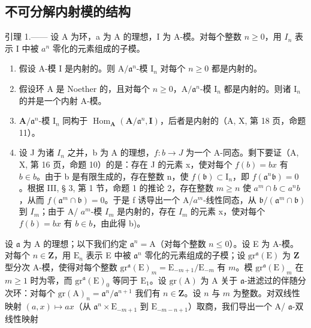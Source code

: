 \subsection{不可分解内射模的结构}

引理 1.—— 设 A 为环，a 为 A 的理想，I 为 A-模。对每个整数 \(n \geqslant 0\)，用 \(I_{n}\) 表示 I 中被 \(a^{n}\) 零化的元素组成的子模。

\begin{enumerate}
\def\labelenumi{\alph{enumi})}
\item
  假设 A-模 I 是内射的。则 \(\mathrm{A} / \mathfrak{a}^n\)-模 \(\mathrm{I}_n\) 对每个 \(n \geqslant 0\) 都是内射的。
\item
  假设环 A 是 Noether 的，且对每个 \(n \geqslant 0\)，\(\mathrm{A} / \mathfrak{a}^n\)-模 \(\mathrm{I}_n\) 都是内射的。则诸 \(\mathrm{I}_n\) 的并是一个内射 A-模。
\item
  \(\mathbf{A} / \mathfrak{a}^n\)-模 \(\mathrm{I}_n\) 同构于 \(\operatorname{Hom}_{\mathbf{A}}(\mathbf{A} / \mathfrak{a}^n, \mathbf{I})\)，后者是内射的（A, X, 第 18 页，命题 11）。
\item
  设 J 为诸 \(I_{n}\) 之并，b 为 A 的理想，\(f : b \to J\) 为一个 A-同态。剩下要证（A, X, 第 16 页，命题 10）的是：存在 J 的元素 x，使对每个 \(f(b) = bx\) 有 \(b \in b\)。由于 b 是有限生成的，存在整数 n，使 \(f(\mathfrak{b}) \subset \mathrm{I}_{n}\)，即 \(f(\mathfrak{a}^{n}\mathfrak{b}) = 0\)。根据 III, § 3, 第 1 节，命题 1 的推论 2，存在整数 \(m \geqslant n\) 使 \(a^{m} \cap b \subset a^{n}b\)，从而 \(f(\mathfrak{a}^{m} \cap \mathfrak{b}) = 0\)。于是 f 诱导出一个 A/\(a^{m}\)-线性同态，从 \(\mathfrak{b}/(\mathfrak{a}^{m} \cap \mathfrak{b})\) 到 \(I_{m}\)；由于 A/ \(a^{m}\)-模 \(I_{m}\) 是内射的，存在 \(I_{m}\) 的元素 x，使对每个 \(f(b) = bx\) 有 \(b \in b\)，由此得 b)。
\end{enumerate}

设 \(\mathfrak{a}\) 为 A 的理想；以下我们约定 \(\mathfrak{a}^n = \mathrm{A}\)（对每个整数 \(n \leqslant 0\)）。设 E 为 A-模。对每个 \(n \in \mathbf{Z}\)，用 \(\mathrm{E}_n\) 表示 E 中被 \(\mathfrak{a}^n\) 零化的元素组成的子模；设 \(\mathrm{gr}^{\mathfrak{a}}(\mathrm{E})\) 为 \(\mathbf{Z}\) 型分次 A-模，使得对每个整数 \(\mathrm{gr}^{\mathfrak{a}}(\mathrm{E})_m = \mathrm{E}_{-m+1}/\mathrm{E}_{-m}\) 有 \(m\)。模 \(\mathrm{gr}^{\mathfrak{a}}(\mathrm{E})_m\) 在 \(m \geqslant 1\) 时为零，而 \(\mathrm{gr}^{\mathfrak{a}}(\mathrm{E})_0\) 等同于 \(\mathrm{E}_1\)。设 \(\mathrm{gr}(\mathrm{A})\) 为 A 关于 \(\mathfrak{a}\)-进滤过的伴随分次环：对每个 \(\mathrm{gr}(\mathrm{A})_n = \mathfrak{a}^n/\mathfrak{a}^{n+1}\) 我们有 \(n \in \mathbf{Z}\)。设 \(n\) 与 \(m\) 为整数。对双线性映射 \((a,x) \mapsto ax\)（从 \(\mathfrak{a}^n \times \mathrm{E}_{-m+1}\) 到 \(\mathrm{E}_{-m-n+1}\)）取商，我们导出一个 A/ \(\mathfrak{a}\)-双线性映射

